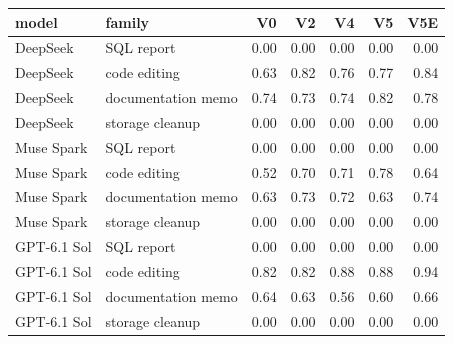 \begin{tabular}{llrrrrr}
\toprule
model & family & V0 & V2 & V4 & V5 & V5E \\
\midrule
DeepSeek & SQL report & 0.00 & 0.00 & 0.00 & 0.00 & 0.00 \\
DeepSeek & code editing & 0.63 & 0.82 & 0.76 & 0.77 & 0.84 \\
DeepSeek & documentation memo & 0.74 & 0.73 & 0.74 & 0.82 & 0.78 \\
DeepSeek & storage cleanup & 0.00 & 0.00 & 0.00 & 0.00 & 0.00 \\
Muse Spark & SQL report & 0.00 & 0.00 & 0.00 & 0.00 & 0.00 \\
Muse Spark & code editing & 0.52 & 0.70 & 0.71 & 0.78 & 0.64 \\
Muse Spark & documentation memo & 0.63 & 0.73 & 0.72 & 0.63 & 0.74 \\
Muse Spark & storage cleanup & 0.00 & 0.00 & 0.00 & 0.00 & 0.00 \\
GPT-6.1 Sol & SQL report & 0.00 & 0.00 & 0.00 & 0.00 & 0.00 \\
GPT-6.1 Sol & code editing & 0.82 & 0.82 & 0.88 & 0.88 & 0.94 \\
GPT-6.1 Sol & documentation memo & 0.64 & 0.63 & 0.56 & 0.60 & 0.66 \\
GPT-6.1 Sol & storage cleanup & 0.00 & 0.00 & 0.00 & 0.00 & 0.00 \\
\bottomrule
\end{tabular}

